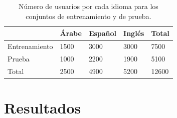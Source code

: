 \documentclass[runningheads]{llncs}
\begin{document}
\begin{table}[]
\caption{Número de usuarios por cada idioma para los conjuntos de entrenamiento y de prueba.}\label{table-datasets}
\centering
\begin{tabular}{|l|l|l|l|l|}
\hline
              & Árabe & Español & Inglés & Total \\ \hline
Entrenamiento & 1500  & 3000    & 3000   & 7500  \\ \hline
Prueba        & 1000  & 2200    & 1900   & 5100  \\ \hline
Total         & 2500  & 4900    & 5200   & 12600 \\ \hline
\end{tabular}
\end{table}

\section{Resultados}
\end{document}
